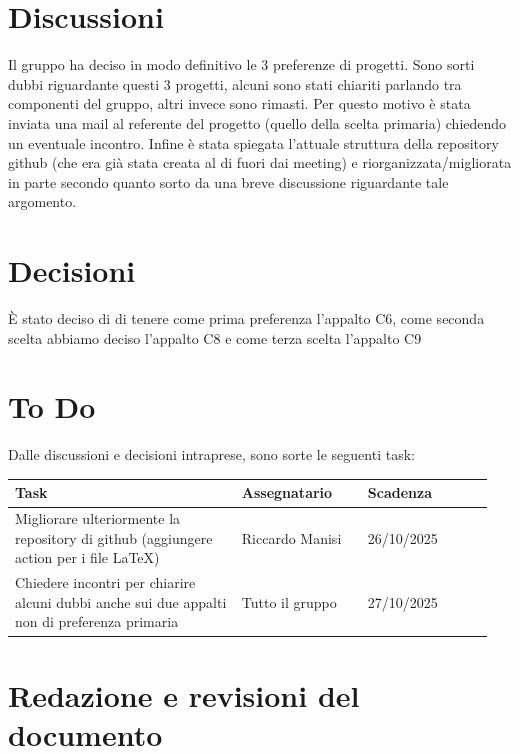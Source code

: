 \documentclass[a4paper,12pt]{article}
\begin{document}
\section{Discussioni}
Il gruppo ha deciso in modo definitivo le 3 preferenze di progetti. Sono sorti dubbi riguardante questi 3 progetti, alcuni sono stati chiariti parlando tra componenti del gruppo, altri invece sono rimasti. Per questo motivo è stata inviata una mail al referente del progetto (quello della scelta primaria) chiedendo un eventuale incontro. Infine è stata spiegata l'attuale struttura della repository github (che era già stata creata al di fuori dai meeting) e riorganizzata/migliorata in parte secondo quanto sorto da una breve discussione riguardante tale argomento.

\section{Decisioni}
È stato deciso di di tenere come prima preferenza l'appalto C6, come seconda scelta abbiamo deciso l'appalto C8 e come terza scelta l'appalto C9

\section{To Do}
Dalle discussioni e decisioni intraprese, sono sorte le seguenti task:

\begin{center}
\small
\renewcommand{\arraystretch}{1.2} 
\begin{tabular}{|p{0.45\linewidth}|p{0.25\linewidth}|p{0.25\linewidth}|}
\hline
\rowcolor{gray!60} 
\textbf{Task} & \textbf{Assegnatario} & \textbf{Scadenza} \\
\hline
\rowcolor{white}
Migliorare ulteriormente la repository di github (aggiungere action per i file LaTeX) & Riccardo Manisi & 26/10/2025 \\
\hline
\rowcolor{white}
Chiedere incontri per chiarire alcuni dubbi anche sui due appalti non di preferenza primaria & Tutto il gruppo & 27/10/2025 \\
\hline
\end{tabular}
\end{center}

\clearpage
\section{Redazione e revisioni del documento}
\end{document}
